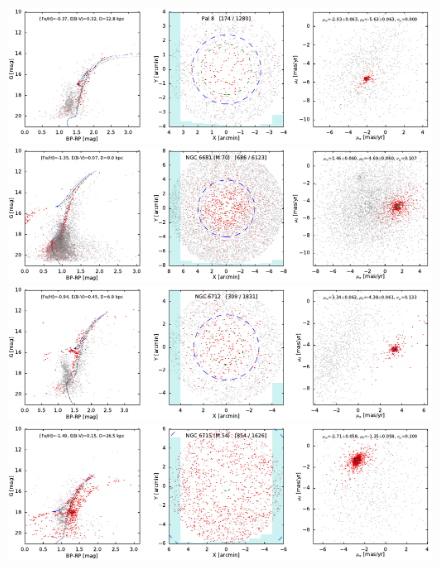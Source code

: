 \documentclass[usenatbib]{mnras}
\begin{document}
\clearpage\begin{figure}
\contcaption{}
\includegraphics{figs/Pal_8.pdf}
\includegraphics{figs/NGC_6681_M_70.pdf}
\includegraphics{figs/NGC_6712.pdf}
\includegraphics{figs/NGC_6715_M_54.pdf}
\end{figure}
\end{document}
